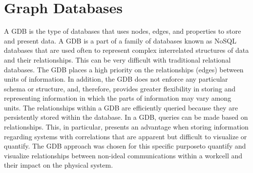 \section{Graph Databases}
A GDB is the type of databases that uses nodes, edges, and properties to store and present data. A GDB is a part of a family of databases known as NoSQL databases that are used often to represent complex interrelated structures of data and their relationships.  This can be very difficult with traditional relational databases.  The GDB places a high priority on the relationships (edges) between units of information.  In addition, the GDB does not enforce any particular schema or structure, and, therefore, provides greater flexibility in storing and representing information in which the parts of information may vary among units. The relationships within a GDB are efficiently queried because they are persistently stored within the database.  In a GDB, queries can be made based on relationships. This, in particular, presents an advantage when storing information regarding systems with correlations that are apparent but difficult to visualize or quantify. The GDB approach was chosen for this specific purpose\textemdash{}to quantify and visualize relationships between non-ideal communications within a workcell and their impact on the physical system.

